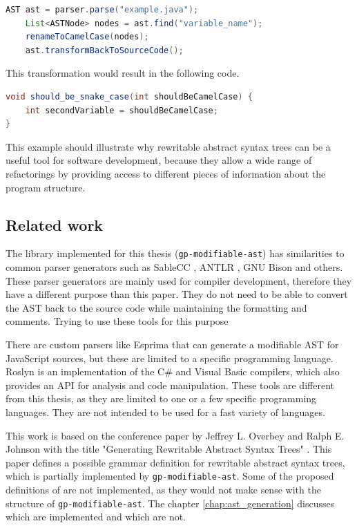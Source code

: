 \begin{lstlisting}[language=Java, caption=Example of transformation]
    AST ast = parser.parse("example.java");
    List<ASTNode> nodes = ast.find("variable_name");
    renameToCamelCase(nodes);
    ast.transformBackToSourceCode();
\end{lstlisting}

This transformation would result in the following code.

\begin{lstlisting}[language=Java, caption=Example of transformation]
void should_be_snake_case(int shouldBeCamelCase) {
    int secondVariable = shouldBeCamelCase;
}
\end{lstlisting}

This example should illustrate why rewritable abstract syntax trees can be a useful tool for software development, 
because they allow a wide range of refactorings by providing access to different pieces of information about the program structure.

\subsection{Related work}

The library implemented for this thesis (\verb|gp-modifiable-ast|) has similarities to common parser generators 
such as SableCC \cite{sablecc}, ANTLR \cite{antlr}, GNU Bison \cite{gnu-bison} and others.
These parser generators are mainly used for compiler development, therefore they have a different purpose than this paper.
They do not need to be able to convert the AST back to the source code while maintaining the formatting and comments.
Trying to use these tools for this purpose 

There are custom parsers like Esprima \cite{esprima} that can generate a modifiable AST for JavaScript sources, 
but these are limited to a specific programming language.
Roslyn \cite{rosl} is an implementation of the C\# and Visual Basic compilers, which also provides an API for analysis and code manipulation.
These tools are different from this thesis, as they are limited to one or a few specific programming languages.
They are not intended to be used for a fast variety of languages.

This work is based on the conference paper by Jeffrey L. Overbey and Ralph E. Johnson with the title 
"Generating Rewritable Abstract Syntax Trees" \cite{GeneratingRewritableAST}.
This paper defines a possible grammar definition for rewritable abstract syntax trees, which is partially implemented by \verb|gp-modifiable-ast|. 
Some of the proposed definitions of \cite{GeneratingRewritableAST} are not implemented, as they would not make sense with the
structure of \verb|gp-modifiable-ast|. The chapter \ref{chap:ast_generation} discusses which are implemented and which are not.
